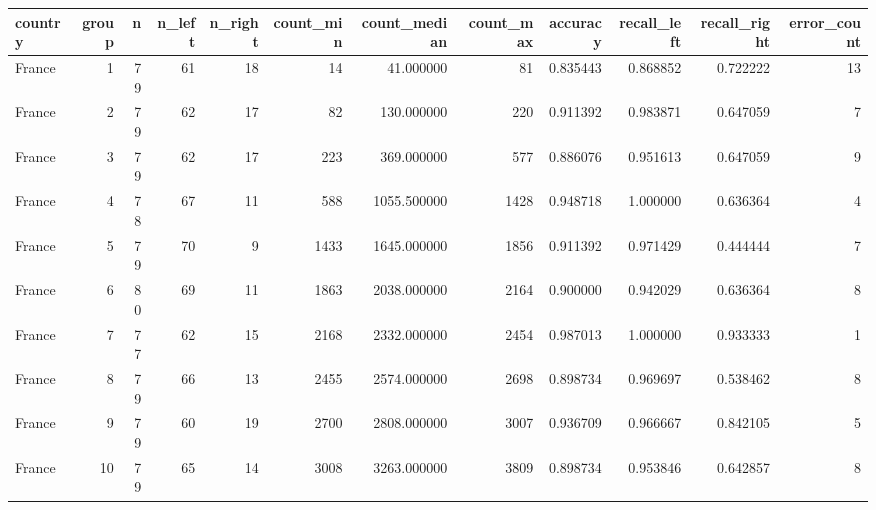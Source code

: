 \begin{tabular}{lrrrrrrrrrrr}
\toprule
country & group & n & n_left & n_right & count_min & count_median & count_max & accuracy & recall_left & recall_right & error_count \\
\midrule
France & 1 & 79 & 61 & 18 & 14 & 41.000000 & 81 & 0.835443 & 0.868852 & 0.722222 & 13 \\
France & 2 & 79 & 62 & 17 & 82 & 130.000000 & 220 & 0.911392 & 0.983871 & 0.647059 & 7 \\
France & 3 & 79 & 62 & 17 & 223 & 369.000000 & 577 & 0.886076 & 0.951613 & 0.647059 & 9 \\
France & 4 & 78 & 67 & 11 & 588 & 1055.500000 & 1428 & 0.948718 & 1.000000 & 0.636364 & 4 \\
France & 5 & 79 & 70 & 9 & 1433 & 1645.000000 & 1856 & 0.911392 & 0.971429 & 0.444444 & 7 \\
France & 6 & 80 & 69 & 11 & 1863 & 2038.000000 & 2164 & 0.900000 & 0.942029 & 0.636364 & 8 \\
France & 7 & 77 & 62 & 15 & 2168 & 2332.000000 & 2454 & 0.987013 & 1.000000 & 0.933333 & 1 \\
France & 8 & 79 & 66 & 13 & 2455 & 2574.000000 & 2698 & 0.898734 & 0.969697 & 0.538462 & 8 \\
France & 9 & 79 & 60 & 19 & 2700 & 2808.000000 & 3007 & 0.936709 & 0.966667 & 0.842105 & 5 \\
France & 10 & 79 & 65 & 14 & 3008 & 3263.000000 & 3809 & 0.898734 & 0.953846 & 0.642857 & 8 \\
\bottomrule
\end{tabular}
